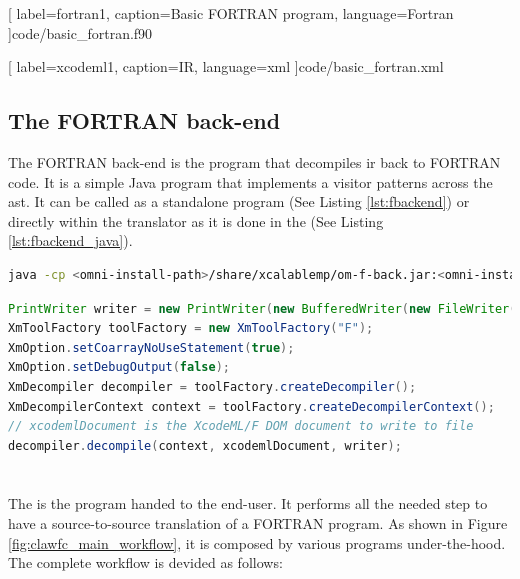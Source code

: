 
  [
    label=fortran1,
    caption=Basic FORTRAN program,
    language=Fortran
  ]{code/basic_fortran.f90}


  [
    label=xcodeml1,
    caption=\xcodeml IR,
    language=xml
  ]{code/basic_fortran.xml}

\subsection{The FORTRAN back-end}
The FORTRAN back-end is the program that decompiles \gls{ir} back to FORTRAN
code. It is a simple Java program that implements a visitor patterns across
the \gls{ast}. It can be called as a standalone program (See Listing \ref{lst:fbackend}) or directly within the
translator as it is done in the \clawfcomp (See Listing \ref{lst:fbackend_java}).

\begin{lstlisting}[label=lst:fbackend, language=Bash, caption=Execute the FORTRAN back-end as a standalone]
java -cp <omni-install-path>/share/xcalablemp/om-f-back.jar:<omni-install-path>/share/xcalablemp/om-exc-tools.jar xcodeml.f.util.omx2f -l xcodeml.xml
\end{lstlisting}

\begin{lstlisting}[label=lst:fbackend_java, language=Java, caption=FORTRAN back-end called from Java]
PrintWriter writer = new PrintWriter(new BufferedWriter(new FileWriter(outputFile)));
XmToolFactory toolFactory = new XmToolFactory("F");
XmOption.setCoarrayNoUseStatement(true);
XmOption.setDebugOutput(false);
XmDecompiler decompiler = toolFactory.createDecompiler();
XmDecompilerContext context = toolFactory.createDecompilerContext();
// xcodemlDocument is the XcodeML/F DOM document to write to file
decompiler.decompile(context, xcodemlDocument, writer);
\end{lstlisting}

\section{\clawfcomp}
The \clawfc is the program handed to the end-user. It performs all the needed
step to have a source-to-source translation of a FORTRAN program. As shown in
Figure \ref{fig:clawfc_main_workflow}, it is composed by various programs
under-the-hood. The complete workflow is devided as follows:

